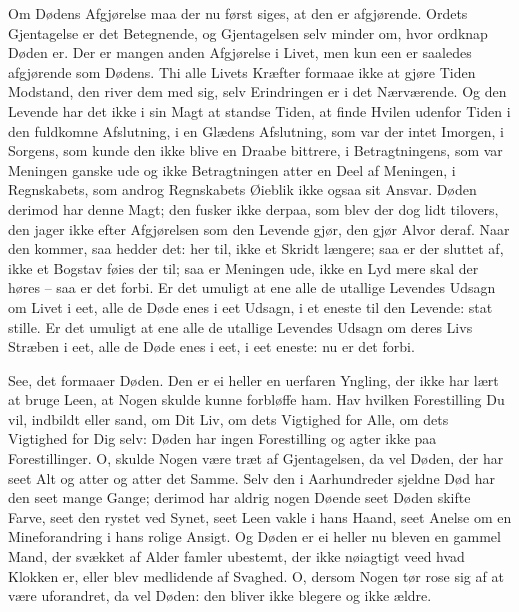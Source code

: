 \documentclass[12pt,a4paper]{article}
\begin{document}
Om Dødens Afgjørelse maa der nu først siges, at den er afgjørende. Ordets Gjentagelse er det Betegnende, og Gjentagelsen selv minder om, hvor ordknap Døden er. Der er mangen anden Afgjørelse i Livet, men kun een er saaledes afgjørende som Dødens. Thi alle Livets Kræfter formaae ikke at gjøre Tiden Modstand, den river dem med sig, selv Erindringen er i det Nærværende. Og den Levende har det ikke i sin Magt at standse Tiden, at finde Hvilen udenfor Tiden i den fuldkomne Afslutning, i en Glædens Afslutning, som var der intet Imorgen, i Sorgens, som kunde den ikke blive en Draabe bittrere, i Betragtningens, som var Meningen ganske ude og ikke Betragtningen atter en Deel af Meningen, i Regnskabets, som androg Regnskabets Øieblik ikke ogsaa sit Ansvar. Døden derimod har denne Magt; den fusker ikke derpaa, som blev der dog lidt tilovers, den jager ikke efter Afgjørelsen som den Levende gjør, den gjør Alvor deraf. Naar den kommer, saa hedder det: her til, ikke et Skridt længere; saa er der sluttet af, ikke et Bogstav føies der til; saa er Meningen ude, ikke en Lyd mere skal der høres – saa er det forbi. Er det umuligt at ene alle de utallige Levendes Udsagn om Livet i eet, alle de Døde enes i eet Udsagn, i et eneste til den Levende: stat stille. Er det umuligt at ene alle de utallige Levendes Udsagn om deres Livs Stræben i eet, alle de Døde enes i eet, i eet eneste: nu er det forbi.

See, det formaaer Døden. Den er ei heller en uerfaren Yngling, der ikke har lært at bruge Leen, at Nogen skulde kunne forbløffe ham. Hav hvilken Forestilling Du vil, indbildt eller sand, om Dit Liv, om dets Vigtighed for Alle, om dets Vigtighed for Dig selv: Døden har ingen Forestilling og agter ikke paa Forestillinger. O, skulde Nogen være træt af Gjentagelsen, da vel Døden, der har seet Alt og atter og atter det Samme. Selv den i Aarhundreder sjeldne Død har den seet mange Gange; derimod har aldrig nogen Døende seet Døden skifte Farve, seet den rystet ved Synet, seet Leen vakle i hans Haand, seet Anelse om en Mineforandring i hans rolige Ansigt. Og Døden er ei heller nu bleven en gammel Mand, der svækket af Alder famler ubestemt, der ikke nøiagtigt veed hvad Klokken er, eller blev medlidende af Svaghed. O, dersom Nogen tør rose sig af at være uforandret, da vel Døden: den bliver ikke blegere og ikke ældre.
\end{document}
